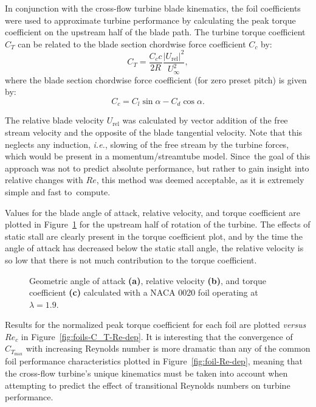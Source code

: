 In conjunction with the cross-flow turbine blade kinematics, the foil
coefficients were used to approximate turbine performance by calculating the
peak torque coefficient on the upstream half of the blade path. The turbine
torque coefficient $C_T$ can be related to the blade section chordwise force
coefficient $C_c$ by:
\begin{equation}
C_T = \frac{C_c c}{2R} \frac{|U_\mathrm{rel}|^2}{U_\infty^2},
\label{eq:ct}
\end{equation}
where the blade section chordwise force coefficient (for zero preset pitch) is
given by:
\begin{equation}
C_c = C_l \sin \alpha - C_d \cos \alpha.
\label{eq:cc}
\end{equation}

The relative blade velocity $U_\mathrm{rel}$ was calculated by vector addition
of the free stream velocity and the opposite of the blade tangential velocity.
Note that this neglects any induction, \emph{i.e.}, slowing of the free stream
by the turbine forces, which would be present in a momentum/streamtube model.
Since~the goal of this approach was not to predict absolute performance, but
rather to gain insight into relative changes with $Re$, this method was deemed
acceptable, as it is extremely simple and fast to~compute.

Values for the blade angle of attack, relative velocity, and torque coefficient
are plotted in Figure~\ref{fig:blade-kinematics} for the upstream half of
rotation of the turbine. The effects of static stall are clearly present in the
torque coefficient plot, and by the time the angle of attack has decreased below
the static stall angle, the relative velocity is so low that there is not much
contribution to the torque coefficient.

\begin{figure}[ht!]
\centering


\caption{Geometric angle of attack \textbf{(a)}, relative velocity
    \textbf{(b)},  and torque coefficient \textbf{(c)} calculated with a NACA
    0020 foil operating at $\lambda=1.9$.}

\label{fig:blade-kinematics}
\end{figure}

Results for the normalized peak torque coefficient for each foil are plotted
\textit{versus} $Re_c$ in Figure~\ref{fig:foils-C_T-Re-dep}. It is interesting
that the convergence of $C_{T_\mathrm{max}}$ with increasing Reynolds number is
more dramatic than any of the common foil performance characteristics plotted in
Figure~\ref{fig:foil-Re-dep}, meaning that the cross-flow turbine's unique
kinematics must be taken into account when attempting to predict the effect of
transitional Reynolds numbers on turbine performance.

